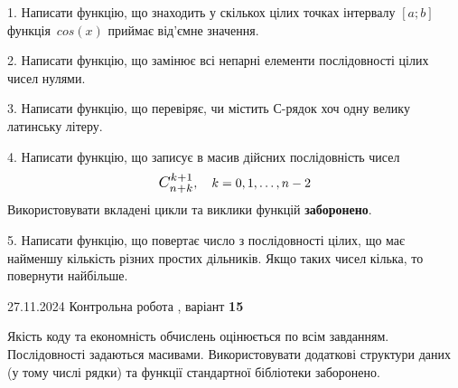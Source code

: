 \documentclass[12pt, ukrainian]{article}
\begin{document}
{{{{{{{{{{{{{{\vspace{2mm}

\begin {large}
1. Написати функцію, що знаходить у скількох цілих точках інтервалу $[a; b]$ функція~$cos(x)$ приймає від'ємне значення.

\vspace{2mm}


2. Написати функцію, що замінює всі непарні елементи послідовності цілих чисел нулями.

\vspace{2mm}


3. Написати функцію, що перевіряє, чи містить С-рядок хоч одну велику латинську літеру.

\vspace{2mm}


4. 
Написати функцію, що записує в масив дійсних послідовність чисел
$$\scalebox{1.2}{$C_{n+k}^{k+1}$}, \quad k=0,1,\ldots,n-2$$
Використовувати вкладені цикли та виклики функцій \textbf{заборонено}.

\vspace{2mm}


5. Написати функцію, що повертає число з послідовності цілих, що має найменшу кількість різних простих дільників. Якщо таких чисел кілька, то повернути найбільше.

\vspace{2mm}

\end{large}
\newpage
{{27.11.2024 Контрольна робота , варіант  \No \textbf { 15 }\par}}


{
Якість коду та економність обчислень оцінюється по всім завданням. Послідовності задаються масивами. Використовувати додаткові структури даних (у тому числі рядки) та функції стандартної бібліотеки заборонено.

\vspace{2mm}

}}}}}}}}}}}}}}}
\end{document}
